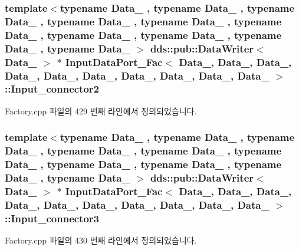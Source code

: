 \subsubsection[{\texorpdfstring{Input\+\_\+connector2}{Input_connector2}}]{\setlength{\rightskip}{0pt plus 5cm}template$<$typename Data\+\_ , typename Data\+\_ , typename Data\+\_ , typename Data\+\_ , typename Data\+\_ , typename Data\+\_ , typename Data\+\_ , typename Data\+\_ , typename Data\+\_ , typename Data\+\_ $>$ dds\+::pub\+::\+Data\+Writer$<$ Data\+\_ $>$ $\ast$ {\bf Input\+Data\+Port\+\_\+\+Fac}$<$ Data\+\_, Data\+\_, Data\+\_, Data\+\_, Data\+\_, Data\+\_, Data\+\_, Data\+\_, Data\+\_, Data\+\_ $>$\+::Input\+\_\+connector2}\hypertarget{classInputDataPort__Fac_a0f6ab746eaa0b690462afbf40116a4c1}{}\label{classInputDataPort__Fac_a0f6ab746eaa0b690462afbf40116a4c1}


Factory.\+cpp 파일의 429 번째 라인에서 정의되었습니다.

\subsubsection[{\texorpdfstring{Input\+\_\+connector3}{Input_connector3}}]{\setlength{\rightskip}{0pt plus 5cm}template$<$typename Data\+\_ , typename Data\+\_ , typename Data\+\_ , typename Data\+\_ , typename Data\+\_ , typename Data\+\_ , typename Data\+\_ , typename Data\+\_ , typename Data\+\_ , typename Data\+\_ $>$ dds\+::pub\+::\+Data\+Writer$<$ Data\+\_ $>$ $\ast$ {\bf Input\+Data\+Port\+\_\+\+Fac}$<$ Data\+\_, Data\+\_, Data\+\_, Data\+\_, Data\+\_, Data\+\_, Data\+\_, Data\+\_, Data\+\_, Data\+\_ $>$\+::Input\+\_\+connector3}\hypertarget{classInputDataPort__Fac_a8d08f056c60a03f2218652df61a644e3}{}\label{classInputDataPort__Fac_a8d08f056c60a03f2218652df61a644e3}


Factory.\+cpp 파일의 430 번째 라인에서 정의되었습니다.

